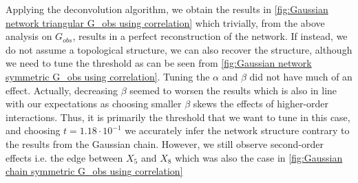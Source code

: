 \documentclass[../Thesis.tex]{subfiles}
\begin{document}
Applying the deconvolution algorithm, we obtain the results in \autoref{fig:Gaussian network triangular G_obs using correlation} which trivially, from the above analysis on $G_{obs}$, results in a perfect reconstruction of the network. If instead, we do not assume a topological structure, we can also recover the structure, although we need to tune the threshold as can be seen from \autoref{fig:Gaussian network symmetric G_obs using correlation}. Tuning the $\alpha$ and $\beta$ did not have much of an effect. Actually, decreasing $\beta$ seemed to worsen the results which is also in line with our expectations as choosing smaller $\beta$ skews the effects of higher-order interactions. Thus, it is primarily the threshold that we want to tune in this case, and choosing $t = 1.18 \cdot 10^{-1}$ we accurately infer the network structure contrary to the results from the Gaussian chain. However, we still observe second-order effects i.e. the edge between $X_5$ and $X_8$ which was also the case in \autoref{fig:Gaussian chain symmetric G_obs using correlation}
\end{document}
